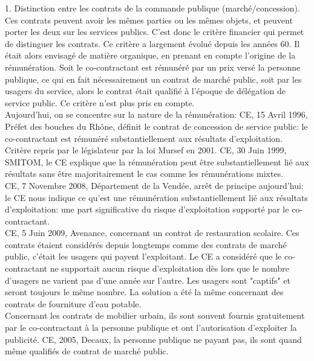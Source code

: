 \documentclass[10pt, a4paper, openany]{book}
\begin{document}
1. Distinction entre les contrats de la commande publique (marché/concession). \\
Ces contrats peuvent avoir les mêmes parties ou les mêmes objets, et peuvent porter les deux sur les services publics. C'est donc le critère financier qui permet de distinguer les contrats. Ce critère a largement évolué depuis les années 60. Il était alors envisagé de matière organique, en prenant en compte l'origine de la rémunération. Soit le co-contractant est rémunéré par un prix versé la personne publique, ce qui en fait nécessairement un contrat de marché public, soit par les usagers du service, alors le contrat était qualifié à l'époque de délégation de service public. Ce critère n'est plus pris en compte. \\
Aujourd'hui, on se concentre sur la nature de la rémunération: CE, 15 Avril 1996, Préfet des bouches du Rhône, définit le contrat de concession de service public: le co-contractant est rémunéré substantiellement aux résultats d'exploitation. Critère repris par le législateur par la loi Mursef en 2001. CE, 30 Juin 1999, SMITOM, le CE explique que la rémunération peut être substantiellement lié aux résultats sans être majoritairement le cas comme les rémunérations mixtes. \\
CE, 7 Novembre 2008, Département de la Vendée, arrêt de principe aujourd'hui: le CE nous indique ce qu'est une rémunération substantiellement lié aux résultats d'exploitation: une part significative du risque d'exploitation supporté par le co-contractant. \\
CE, 5 Juin 2009, Avenance, concernant un contrat de restauration scolaire. Ces contrats étaient considérés depuis longtemps comme des contrats de marché public, c'était les usagers qui payent l'exploitant. Le CE a considéré que le co-contractant ne supportait aucun risque d'exploitation dès lors que le nombre d'usagers ne varient pas d'une année sur l'autre. Les usagers sont "captifs" et seront toujours le même nombre. La solution a été la même concernant des contrats de fourniture d'eau potable. \\
Concernant les contrats de mobilier urbain, ils sont souvent fournis gratuitement par le co-contractant à la personne publique et ont l'autorisation d'exploiter la publicité. CE, 2005, Decaux, la personne publique ne payant pas, ils sont quand même qualifiés de contrat de marché public. 
\end{document}
